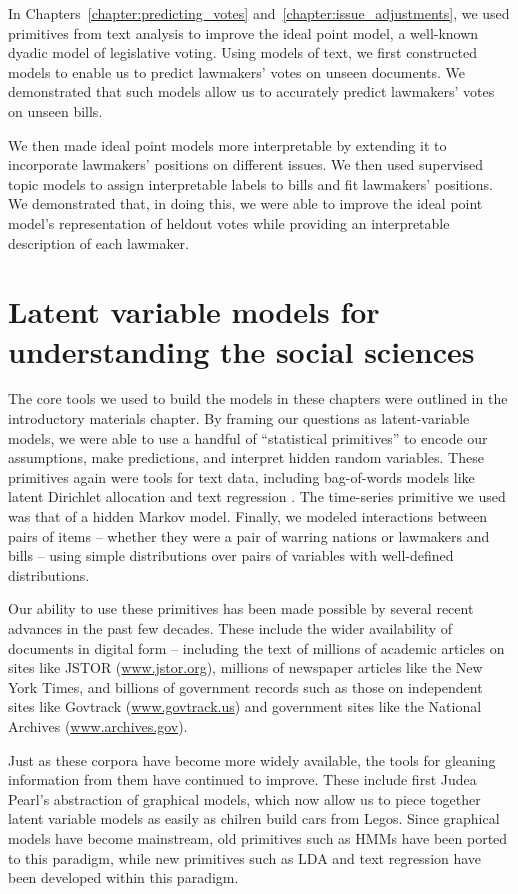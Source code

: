 In Chapters~\ref{chapter:predicting_votes}
and~\ref{chapter:issue_adjustments}, we used primitives from text
analysis to improve the ideal point model, a well-known dyadic model
of legislative voting. Using models of text, we first constructed
models to enable us to predict lawmakers' votes on unseen documents.
We demonstrated that such models allow us to accurately predict
lawmakers' votes on unseen bills.

We then made ideal point models more interpretable by extending it to
incorporate lawmakers' positions on different issues.  We then used
supervised topic models to assign interpretable labels to bills and
fit lawmakers' positions.  We demonstrated that, in doing this, we
were able to improve the ideal point model's representation of heldout
votes while providing an interpretable description of each lawmaker.

\section{Latent variable models for understanding the social sciences}
The core tools we used to build the models in these chapters were
outlined in the introductory materials chapter.  By framing our
questions as latent-variable models, we were able to use a handful of
``statistical primitives'' to encode our assumptions, make
predictions, and interpret hidden random variables.  These primitives
again were tools for text data, including bag-of-words models like
latent Dirichlet allocation \citep{blei:2006} and text regression
\citep{kogan:2009}.  The time-series primitive we used was that
of a hidden Markov model.  Finally, we modeled interactions between
pairs of items -- whether they were a pair of warring nations or lawmakers and
bills -- using simple distributions over pairs of variables with
well-defined distributions.

Our ability to use these primitives has been made possible by several
recent advances in the past few decades.  These include the wider
availability of documents in digital form -- including the text of
millions of academic articles on sites like JSTOR (\url{www.jstor.org}), millions of
newspaper articles like the New York Times, and billions of government
records such as those on independent sites like Govtrack
(\url{www.govtrack.us}) and government sites like the National
Archives (\url{www.archives.gov}).

Just as these corpora have become more widely available, the tools for
gleaning information from them have continued to improve.  These
include first Judea Pearl's abstraction of graphical models,
which now allow us to piece together latent variable models as easily
as chilren build cars from Legos\texttrademark \citep{pearl:1985}.  Since graphical
models have become mainstream, old primitives such as HMMs have been
ported to this paradigm, while new primitives such as LDA and text
regression have been developed within this paradigm.

